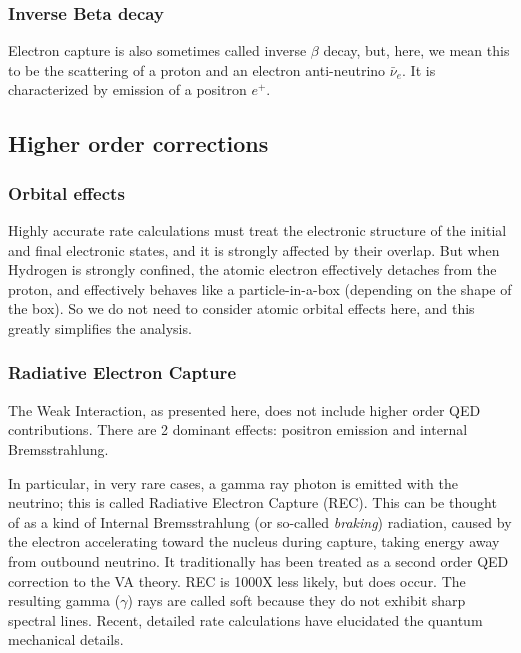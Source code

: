 \documentclass[%
 aip,
 jmp,%
 amsmath,amssymb,
 reprint,%
]{revtex4-1}
\begin{document}
\subsubsection{Inverse Beta decay} 

Electron capture is also sometimes called inverse $\beta$ decay, but, here, we mean this to be the scattering of a proton and an electron anti-neutrino $\bar{\nu}_{e}$.  It is characterized by emission of a positron $e^{+}$. 

\subsection{Higher order corrections}

\subsubsection{Orbital effects}
Highly accurate rate calculations must treat the electronic structure of the initial and final electronic states, and it is strongly affected by their overlap.  But when Hydrogen is strongly confined, the atomic electron effectively detaches from the proton, and effectively behaves like a particle-in-a-box (depending on the shape of the box).\cite{Sen}  So we do not need to consider atomic orbital effects here, and this greatly simplifies the analysis. 

\subsubsection{Radiative Electron Capture}

The Weak Interaction, as presented here, does not include higher order QED contributions.  There are 2 dominant effects: positron emission and internal Bremsstrahlung.\cite{Jauch}

In particular, in very rare cases, a gamma ray photon is emitted with the neutrino; this is called Radiative Electron Capture (REC).\cite{glauber1,glauber2, Jauch, roec2007} This can be thought of as a kind of Internal Bremsstrahlung (or so-called \emph{braking}) radiation, caused by the electron accelerating toward the nucleus during capture, taking energy away from outbound neutrino.\cite{jackson} It traditionally has been treated as a second order QED correction to the VA theory.\cite{Jauch}  REC is 1000X less likely, but does occur.   The resulting gamma ($\gamma$) rays are called soft because they do not exhibit sharp spectral lines.    Recent, detailed rate calculations have elucidated the quantum mechanical details.\cite{roec2007}
\end{document}

